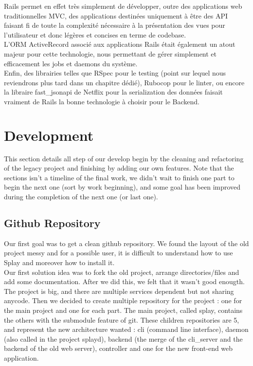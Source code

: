 \documentclass{eplmastersthesis}
\begin{document}
        Rails permet en effet très simplement de développer, outre des
        applications web traditionnelles MVC, des applications destinées uniquement
        à être des API faisant fi de toute la complexité nécessaire à la
        présentation des vues pour l'utilisateur et donc légères et concises
        en terme de codebase.\\
        L'ORM ActiveRecord associé aux applications Rails était également un
        atout majeur pour cette technologie, nous permettant de gérer
        simplement et efficacement les jobs et daemons du système.\\
        Enfin, des librairies telles que RSpec pour le testing (point sur
        lequel nous reviendrons plus tard dans un chapitre dédié), Rubocop pour
        le linter, ou encore la libraire fast\_jsonapi de Netflix pour la
        serialization des données faisait vraiment de Rails la bonne technologie
        à choisir pour le Backend.

    \section{Development}
      
      This section details all step of our develop begin by the cleaning and refactoring of the 
      legacy project and finishing by adding our own features. Note that the sections isn't a timeline
      of the final work, we didn't wait to finish one part to begin the next one (sort by work beginning), 
      and some goal has been improved during the completion of the next one (or last one).

      \subsection{Github Repository}

        Our first goal was to get a clean github repository. We found the layout of the old project messy
        and for a possible user, it is difficult to understand how to use Splay and moreover how to install it. \\

        Our first solution idea was to fork the old project, arrange directories/files and add 
        some documentation. After we did this, we felt that it wasn't good enougth. The project is big,
        and there are multiple services dependent but not sharing anycode. Then we decided to create multiple 
        repository for the project : one for the main project and one for each part. The main project, 
        called splay, contains the others with the submodule \cite{GitSubmodules} feature of git.
        These children repositories are 5, and represent the new architecture wanted : 
        cli (command line interface), daemon (also called in the project splayd), backend 
        (the merge of the cli\_server and the backend of the old web server), controller 
        and one for the new front-end web application. \\
\end{document}
